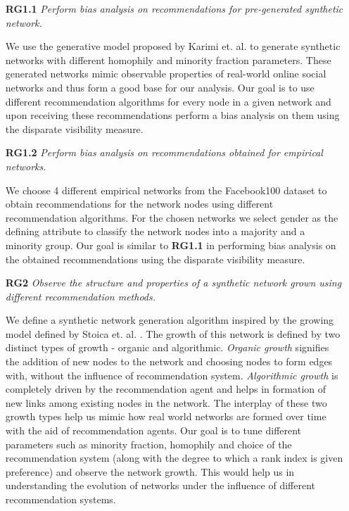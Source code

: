 \begin{itemize}
	\item[\textbf{RG1.1}\label{rg1.1}] \textit{Perform bias analysis on recommendations for pre-generated synthetic network.}
	
	We use the generative model proposed by Karimi et. al. \cite{karimi2018homophily} to generate synthetic networks with different homophily and minority fraction parameters. These generated networks mimic observable properties of real-world online social networks and thus form a good base for our analysis. Our goal is to use different recommendation algorithms for every node in a given network and upon receiving these recommendations perform a bias analysis on them using the disparate visibility measure.
	
	\item[\textbf{RG1.2}\label{rg1.2}] \textit{Perform bias analysis on recommendations obtained for empirical networks.} 
	
	We choose 4 different empirical networks from the Facebook100 dataset \cite{traud2012social} to obtain recommendations for the network nodes using different recommendation algorithms. For the chosen networks we select gender as the defining attribute to classify the network nodes into a majority and a minority group. Our goal is similar to \textbf{RG1.1} in performing bias analysis on the obtained recommendations using the disparate visibility measure.
	
	\item[\textbf{RG2}\label{rg2}] \textit{Observe the structure and properties of a synthetic network grown using different recommendation methods.}
	
	We define a synthetic network generation algorithm inspired by the growing model defined by Stoica et. al. \cite{stoica2018algorithmic}. The growth of this network is defined by two distinct types of growth - organic and algorithmic. \textit{Organic growth} signifies the addition of new nodes to the network and choosing nodes to form edges with, without the influence of recommendation system. \textit{Algorithmic growth} is completely driven by the recommendation agent and helps in formation of new links among existing nodes in the network. The interplay of these two growth types help us mimic how real world networks are formed over time with the aid of recommendation agents. Our goal is to tune different parameters such as minority fraction, homophily and choice of the recommendation system (along with the degree to which a rank index is given preference) and observe the network growth. This would help us in understanding the evolution of networks under the influence of different recommendation systems. 
	
\end{itemize} 

